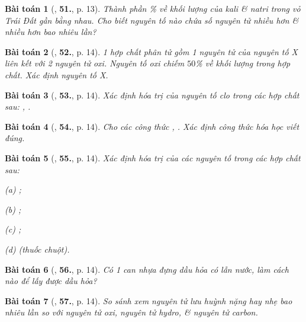 \documentclass{article}
\numberwithin{equation}{section}
\newtheorem{baitoan}{Bài toán}[section]
\begin{document}
\begin{baitoan}[\cite{An2011}, \textbf{51.}, p. 13]
	Thành phần \% về khối lượng của kali \& natri trong vỏ Trái Đất gần bằng nhau. Cho biết nguyên tố nào chứa số nguyên tử nhiều hơn \& nhiều hơn bao nhiêu lần?
\end{baitoan}

\begin{baitoan}[\cite{An2011}, \textbf{52.}, p. 14]
	1 hợp chất phân tử gồm 1 nguyên tử của nguyên tố X liên kết với 2 nguyên tử oxi. Nguyên tố oxi chiếm $50$\% về khối lượng trong hợp chất. Xác định nguyên tố X.
\end{baitoan}

\begin{baitoan}[\cite{An2011}, \textbf{53.}, p. 14]
	Xác định hóa trị của nguyên tố clo trong các hợp chất sau: , .
\end{baitoan}

\begin{baitoan}[\cite{An2011}, \textbf{54.}, p. 14]
	Cho các công thức , . Xác định công thức hóa học viết đúng.
\end{baitoan}

\begin{baitoan}[\cite{An2011}, \textbf{55.}, p. 14]
	Xác định hóa trị của các nguyên tố trong các hợp chất sau:
	\begin{enumerate*}
		\item[(a)] ;
		\item[(b)] ;
		\item[(c)] ;
		\item[(d)]  (thuốc chuột).
	\end{enumerate*}
\end{baitoan}

\begin{baitoan}[\cite{An2011}, \textbf{56.}, p. 14]
	Có 1 can nhựa đựng dầu hỏa có lẫn nước, làm cách nào để lấy được dầu hỏa?
\end{baitoan}

\begin{baitoan}[\cite{An2011}, \textbf{57.}, p. 14]
	So sánh xem nguyên tử lưu huỳnh nặng hay nhẹ bao nhiêu lần so với nguyên tử oxi, nguyên tử hydro, \& nguyên tử carbon.
\end{baitoan}
\end{document}
